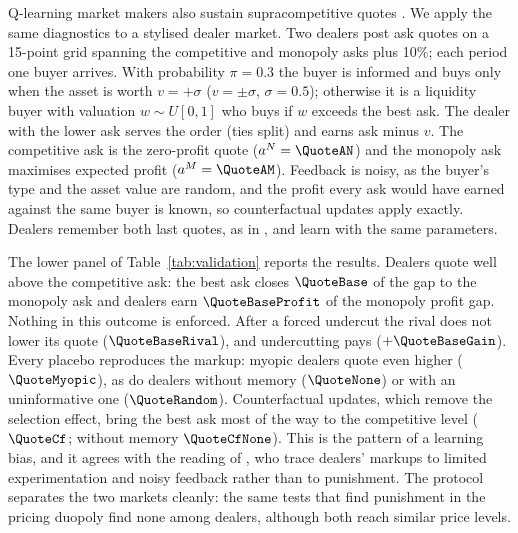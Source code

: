 Q-learning market makers also sustain supracompetitive quotes
\citep{colliard2026}. We apply the same diagnostics to a stylised dealer
market. Two dealers post ask quotes on a 15-point grid spanning the
competitive and monopoly asks plus 10\%; each period one buyer arrives. With
probability $\pi=0.3$ the buyer is informed and buys only when the asset is
worth $v=+\sigma$ ($v=\pm\sigma$, $\sigma=0.5$); otherwise it is a liquidity
buyer with valuation $w\sim U[0,1]$ who buys if $w$ exceeds the best ask. The
dealer with the lower ask serves the order (ties split) and earns ask minus
$v$. The competitive ask is the zero-profit \citet{glosten1985} quote
($a^N=\QuoteAN$) and the monopoly ask maximises expected profit
($a^M=\QuoteAM$). Feedback is noisy, as the buyer's type and the asset value are
random, and the profit every ask would have earned against the same buyer is
known, so counterfactual updates apply exactly. Dealers remember both last
quotes, as in \citet{calvano2020}, and learn with the same parameters.

The lower panel of Table~\ref{tab:validation} reports the results. Dealers
quote well above the competitive ask: the best ask closes $\QuoteBase$ of the
gap to the monopoly ask and dealers earn $\QuoteBaseProfit$ of the monopoly
profit gap. Nothing in this outcome is enforced. After a forced undercut the
rival does not lower its quote ($\QuoteBaseRival$), and undercutting pays
($+\QuoteBaseGain$). Every placebo reproduces the markup: myopic dealers
quote even higher ($\QuoteMyopic$), as do dealers without memory
($\QuoteNone$) or with an uninformative one ($\QuoteRandom$). Counterfactual
updates, which remove the selection effect, bring the best ask most of the
way to the competitive level ($\QuoteCf$; without memory $\QuoteCfNone$).
This is the pattern of a learning bias, and it agrees with the reading of
\citet{colliard2026}, who trace dealers' markups to limited experimentation
and noisy feedback rather than to punishment. The protocol separates the two
markets cleanly: the same tests that find punishment in the pricing duopoly
find none among dealers, although both reach similar price levels.

